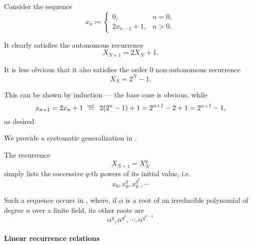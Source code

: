 \begin{example}
\begin{thmenum}
     Consider the sequence
    \begin{equation*}
      x_n \coloneqq \begin{cases}
        0,            &n = 0, \\
        2x_{n-1} + 1, &n > 0.
      \end{cases}
    \end{equation*}

    It clearly satisfies the autonomous recurrence
    \begin{equation*}
      X_{N+1} = 2X_N + 1.
    \end{equation*}

    It is less obvious that it also satisfies the order \( 0 \) non-autonomous recurrence
    \begin{equation*}
      X_N = 2^N - 1.
    \end{equation*}

    This can be shown by induction --- the base case is obvious, while
    \begin{equation*}
      x_{n+1}
      =
      2x_n + 1
      \reloset {\T{ind.}} =
      2(2^n - 1) + 1
      =
      2^{n+1} - 2 + 1
      =
      2^{n+1} - 1,
    \end{equation*}
    as desired.

    We provide a systematic generalization in .

     The recurrence
    \begin{equation*}
      X_{N+1} = X_N^q
    \end{equation*}
    simply lists the successive \( q \)-th powers of its initial value, i.e.
    \begin{equation*}
      x_0, x_0^q, x_0^{q^2}, \cdots
    \end{equation*}

    Such a sequence occurs in , where, if \( \alpha \) is a root of an irreducible polynomial of degree \( n \) over a finite field, its other roots are
    \begin{equation*}
      \alpha^q, \alpha^{q^2}, \cdots, \alpha^{q^{n-1}}
    \end{equation*}
  \end{thmenum}
\end{example}

\paragraph{Linear recurrence relations}

